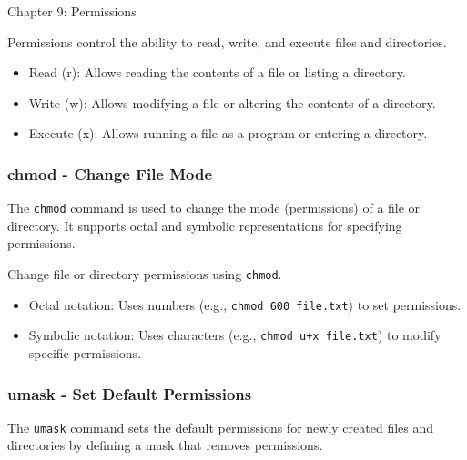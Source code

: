 \begin{notes}{Chapter 9: Permissions}
    \begin{highlight}
    
    Permissions control the ability to read, write, and execute files and directories.
    
    \begin{itemize}
        \item Read (r): Allows reading the contents of a file or listing a directory.
        \item Write (w): Allows modifying a file or altering the contents of a directory.
        \item Execute (x): Allows running a file as a program or entering a directory.
    \end{itemize}
    
    \end{highlight}
    
    \subsubsection*{chmod - Change File Mode}
    
    The \texttt{chmod} command is used to change the mode (permissions) of a file or directory. It supports octal and symbolic representations for specifying permissions.
    
    \begin{highlight}
    
    Change file or directory permissions using \texttt{chmod}.
    
    \begin{itemize}
        \item Octal notation: Uses numbers (e.g., \texttt{chmod 600 file.txt}) to set permissions.
        \item Symbolic notation: Uses characters (e.g., \texttt{chmod u+x file.txt}) to modify specific permissions.
    \end{itemize}
    
    \end{highlight}
    
    \subsubsection*{umask - Set Default Permissions}
    
    The \texttt{umask} command sets the default permissions for newly created files and directories by defining a mask that removes permissions.
    

\end{notes}
